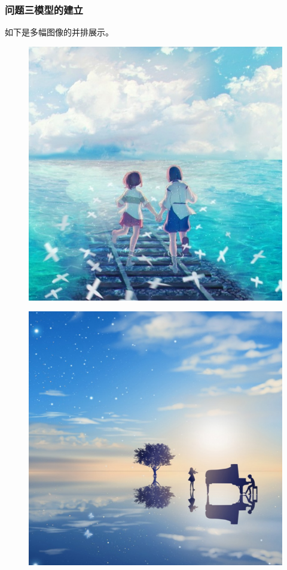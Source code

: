 \documentclass[nogbt]{my_cumcmthesis}
\begin{document}
\subsubsection{问题三模型的建立}
   如下是多幅图像的并排展示。
    \begin{figure}[htbp] %
        \centering
        \begin{minipage}[c]{0.48\textwidth}
            \centering
            \includegraphics[scale=0.45]{source/朋友.jpg} %
            \label{fig:friends}
        \end{minipage}
        \begin{minipage}[c]{0.48\textwidth}
            \centering
            \includegraphics[scale=0.45]{source/合奏.png}

\end{minipage}
\end{figure}
\end{document}
